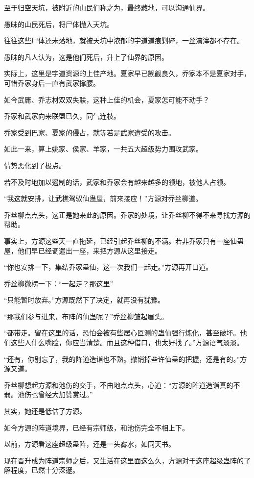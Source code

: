 \begin{this_body}
至于归空天坑，被附近的山民们称之为，最终藏地，可以沟通仙界。

愚昧的山民死后，将尸体抛入天坑。

往往这些尸体还未落地，就被天坑中浓郁的宇道道痕剿碎，一丝渣滓都不存在。

愚昧的凡人认为，这是他们死后，升上了仙界的原因。

实际上，这里是宇道资源的上佳产地。夏家早已觊觎良久，乔家本不是夏家对手，可惜乔家身后一直有武家撑腰。

如今武庸、乔志材双双失联，这种上佳的机会，夏家怎可能不动手？

乔家和武家向来联盟已久，同气连枝。

乔家受到巴家、夏家的侵占，就等若是武家遭受的攻击。

如此一来，算上姚家、侯家、羊家，一共五大超级势力围攻武家。

情势恶化到了极点。

若不及时地加以遏制的话，武家和乔家会有越来越多的领地，被他人占领。

“我这就安排，让武樵驾驭仙蛊屋，前来接应！”方源对乔丝柳道。

乔丝柳点点头，这正是她来此的原因。乔家的处境，让乔丝柳不得不来寻找方源的帮助。

事实上，方源这些天一直拖延，已经引起乔丝柳的不满。若非乔家只有一座仙蛊屋，他们早已经调遣出一座，来把方源从这里接走。

“你也安排一下，集结乔家蛊仙，这一次我们一起走。”方源再开口道。

乔丝柳微楞一下：“一起走？那这里”

“只能暂时放弃。”方源既然下了决定，就再没有犹豫。

“那我们参与进来，布阵的仙蛊呢？”乔丝柳皱起眉头。

“都带走。留在这里的话，恐怕会被有些居心叵测的蛊仙强行炼化，甚至破坏。他们这些人什么嘴脸，你应当清楚。而且这种借口，也太好找了。”方源语气淡淡。

“还有，你别忘了，我的阵道造诣也不熟。撤销掉些许仙蛊的把握，还是有的。”方源又道。

乔丝柳想起方源和池伤的交手，不由地点点头，心道：“方源的阵道造诣真的不弱。池伤也曾经大加赞赏过。”

其实，她还是低估了方源。

如今方源的阵道境界，已经有宗师级，和池伤完全不相上下。

以前，方源看这座超级蛊阵，还是一头雾水，如同天书。

现在晋升成为阵道宗师之后，又生活在这里面这么久，方源对于这座超级蛊阵的了解程度，已然十分深邃。


\end{this_body}
